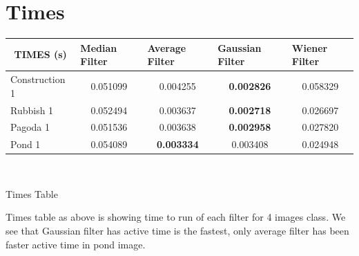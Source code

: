 \section*{Times}
\vspace{2cm}
\begin{center}

\begin{tabular}{|l|l|l|c|l|l|c|l|l|c|l|l|c|l|l|}
\hline
\multicolumn{3}{|c|}{TIMES (s)}      & \multicolumn{3}{l|}{Median Filter} & \multicolumn{3}{l|}{Average Filter}    & \multicolumn{3}{l|}{Gaussian Filter}   & \multicolumn{3}{l|}{Wiener Filter} \\ \hline
\multicolumn{3}{|l|}{Construction 1} & \multicolumn{3}{c|}{0.051099}      & \multicolumn{3}{c|}{0.004255}          & \multicolumn{3}{c|}{\textbf{0.002826}} & \multicolumn{3}{c|}{0.058329}      \\ \hline
\multicolumn{3}{|l|}{Rubbish 1}      & \multicolumn{3}{c|}{0.052494}      & \multicolumn{3}{c|}{0.003637}          & \multicolumn{3}{c|}{\textbf{0.002718}} & \multicolumn{3}{c|}{0.026697}      \\ \hline
\multicolumn{3}{|l|}{Pagoda 1}       & \multicolumn{3}{c|}{0.051536}      & \multicolumn{3}{c|}{0.003638}          & \multicolumn{3}{c|}{\textbf{0.002958}} & \multicolumn{3}{c|}{0.027820}      \\ \hline
\multicolumn{3}{|l|}{Pond 1}         & \multicolumn{3}{c|}{0.054089}      & \multicolumn{3}{c|}{\textbf{0.003334}} & \multicolumn{3}{c|}{0.003408}          & \multicolumn{3}{c|}{0.024948}      \\ \hline
\end{tabular}

\

Times Table
\end{center}
 
Times table as above is showing time to run of each filter for 4 images class. We see that Gaussian filter has active time is the fastest, only average filter has been faster active time in pond image.


